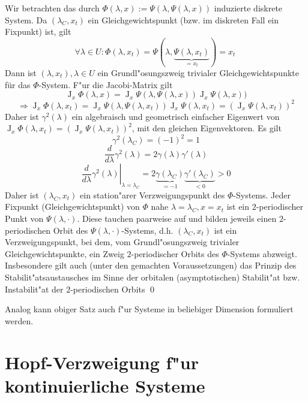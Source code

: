 \documentclass[a4paper, 13pt]{scrreprt}
\theoremstyle{definition} \newtheorem{definition}{Definition}[section]
\newenvironment{beweis}[1][Beweis]{\begin{trivlist}
\item[\hskip \labelsep {\bfseries #1}]}{\end{trivlist}}
\begin{document}
\begin{beweis}
Wir betrachten das durch $\Phi(\lambda,x):=\Psi(\lambda,\Psi(\lambda,x))$ induzierte diskrete System. Da $(\lambda_C, x_t)$ ein Gleichgewichtspunkt (bzw. im diskreten Fall ein Fixpunkt) ist, gilt
\[\forall\lambda\in U: \Phi(\lambda,x_t)=\Psi(\lambda,\underbrace{\Psi(\lambda,x_t)}_{=x_t})=x_t\ \]
Dann ist $(\lambda,x_t), \lambda\in U$ ein Grundl"osungszweig trivialer Gleichgewichtspunkte für das $\Phi$-System. F"ur die Jacobi-Matrix gilt
\[\operatorname{J}_x\Phi(\lambda,x)=\operatorname{J}_x\Psi(\lambda,\Psi(\lambda,x))\operatorname{J}_x\Psi(\lambda,x))\]
\[\Rightarrow \operatorname{J}_x\Phi(\lambda,x_t)=\operatorname{J}_x\Psi(\lambda,\Psi(\lambda,x_t))\operatorname{J}_x\Psi(\lambda,x_t)=(\operatorname{J}_x\Psi(\lambda,x_t))^2\]
Daher ist $\gamma^2(\lambda)$ ein algebraisch und geometrisch einfacher Eigenwert von $\operatorname{J}_x\Phi(\lambda,x_t)=(\operatorname{J}_x\Psi(\lambda,x_t))^2$, mit den gleichen Eigenvektoren.
Es gilt
\[\gamma^2(\lambda_C)=(-1)^2=1\]
\[\frac d {d\lambda}\gamma^2(\lambda)=2\gamma(\lambda)\gamma'(\lambda)\]
\[\left. \frac d {d\lambda}\gamma^2(\lambda)\right |_{\lambda=\lambda_C}=2\underbrace{\gamma(\lambda_C)}_{=-1}\underbrace{\gamma'(\lambda_C)}_{<0}>0\]
Daher ist $(\lambda_C,x_t)$ ein station"arer Verzweigungspunkt des $\Phi$-Systems. Jeder Fixpunkt (Gleichgewichtspunkt) von $\Phi$ nahe $\lambda=\lambda_C, x=x_t$ ist ein $2$-periodischer Punkt von $\Psi(\lambda,\cdot)$. Diese tauchen paarweise auf und bilden jeweils einen $2$-periodischen Orbit des $\Psi(\lambda,\cdot)$-Systems, d.h. $(\lambda_C,x_t)$ ist ein Verzweigungspunkt, bei dem, vom Grundl"osungszweig trivialer Gleichgewichtspunkte, ein Zweig $2$-periodischer Orbits des $\Phi$-Systems abzweigt. Insbesondere gilt auch (unter den gemachten Voraussetzungen) das Prinzip des Stabilit"atsaustausches im Sinne der orbitalen (asymptotischen) Stabilit"at bzw. Instabilit"at der $2$-periodischen Orbits
\qed
\end{beweis}
Analog kann obiger Satz auch f"ur Systeme in beliebiger Dimension formuliert werden.


\section{Hopf-Verzweigung f"ur kontinuierliche Systeme}
\end{document}
